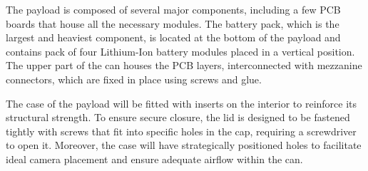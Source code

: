 The payload is composed of several major components, including a few PCB boards that house all the necessary modules. The battery pack, which is the largest and heaviest component, is located at the bottom of the payload and contains pack of four Lithium-Ion battery modules placed in a vertical position. The upper part of the can houses the PCB layers, interconnected with mezzanine connectors, which are fixed in place using screws and glue. %



The case of the payload will be fitted with inserts on the interior to reinforce its structural strength. To ensure secure closure, the lid is designed to be fastened tightly with screws that fit into specific holes in the cap, requiring a screwdriver to open it. Moreover, the case will have strategically positioned holes to facilitate ideal camera placement and ensure adequate airflow within the can. 
